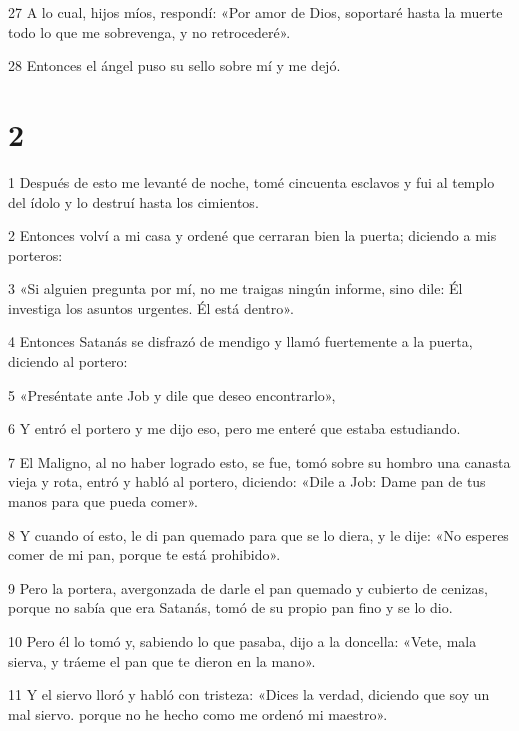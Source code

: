 \par 27 A lo cual, hijos míos, respondí: «Por amor de Dios, soportaré hasta la muerte todo lo que me sobrevenga, y no retrocederé».

\par 28 Entonces el ángel puso su sello sobre mí y me dejó.

\chapter{2}

\par 1 Después de esto me levanté de noche, tomé cincuenta esclavos y fui al templo del ídolo y lo destruí hasta los cimientos.

\par 2 Entonces volví a mi casa y ordené que cerraran bien la puerta; diciendo a mis porteros:

\par 3 «Si alguien pregunta por mí, no me traigas ningún informe, sino dile: Él investiga los asuntos urgentes. Él está dentro».

\par 4 Entonces Satanás se disfrazó de mendigo y llamó fuertemente a la puerta, diciendo al portero:

\par 5 «Preséntate ante Job y dile que deseo encontrarlo»,

\par 6 Y entró el portero y me dijo eso, pero me enteré que estaba estudiando.

\par 7 El Maligno, al no haber logrado esto, se fue, tomó sobre su hombro una canasta vieja y rota, entró y habló al portero, diciendo: «Dile a Job: Dame pan de tus manos para que pueda comer».

\par 8 Y cuando oí esto, le di pan quemado para que se lo diera, y le dije: «No esperes comer de mi pan, porque te está prohibido».

\par 9 Pero la portera, avergonzada de darle el pan quemado y cubierto de cenizas, porque no sabía que era Satanás, tomó de su propio pan fino y se lo dio.

\par 10 Pero él lo tomó y, sabiendo lo que pasaba, dijo a la doncella: «Vete, mala sierva, y tráeme el pan que te dieron en la mano».

\par 11 Y el siervo lloró y habló con tristeza: «Dices la verdad, diciendo que soy un mal siervo. porque no he hecho como me ordenó mi maestro».

